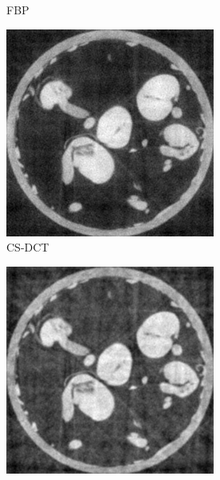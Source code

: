 \documentclass{article}
\begin{document}
\begin{figure}[h]
\begin{subfigure}[b]{0.3\linewidth}
        \caption{FBP}
    \end{subfigure}
    \begin{subfigure}[b]{0.3\linewidth}
        \includegraphics[width=\textwidth]{../images/supplementary/2D_sprouts/154_angles/1/cs_dct.png}
        \caption{CS-DCT}
     \end{subfigure}
    \begin{subfigure}[b]{0.3\linewidth}
        \includegraphics[width=\textwidth]{../images/supplementary/2D_sprouts/154_angles/1/cs_wavelet.png}

\end{subfigure}
\end{figure}
\end{document}
